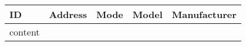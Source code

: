 \documentclass{report}
\begin{document}
\begin{table}[t!]
\centering
\begin{tabular}{m{1cm}|m{2cm}|m{3cm}|m{4cm}|m{3cm}}
\textbf{ID} & \textbf {Address} & \textbf{Mode} & \textbf{Model} & \textbf{Manufacturer}\\
\hline
{{content}}
\end{tabular}
\end{table}
\end{document}
